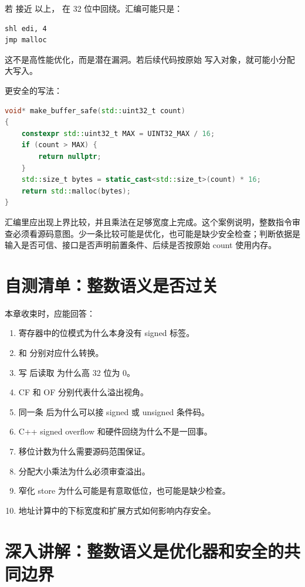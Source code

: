 若  接近  以上， 在 32 位中回绕。汇编可能只是：

\begin{lstlisting}
shl edi, 4
jmp malloc
\end{lstlisting}

这不是高性能优化，而是潜在漏洞。若后续代码按原始  写入对象，就可能小分配大写入。

更安全的写法：

\begin{lstlisting}[language=C++]
void* make_buffer_safe(std::uint32_t count)
{
    constexpr std::uint32_t MAX = UINT32_MAX / 16;
    if (count > MAX) {
        return nullptr;
    }
    std::size_t bytes = static_cast<std::size_t>(count) * 16;
    return std::malloc(bytes);
}
\end{lstlisting}

汇编里应出现上界比较，并且乘法在足够宽度上完成。这个案例说明，整数指令审查必须看源码意图。少一条比较可能是优化，也可能是缺少安全检查；判断依据是输入是否可信、接口是否声明前置条件、后续是否按原始 count 使用内存。

\section{自测清单：整数语义是否过关}

本章收束时，应能回答：

\begin{enumerate}
  \item 寄存器中的位模式为什么本身没有 signed 标签。
  \item {} 和  分别对应什么转换。
  \item 写  后读取  为什么高 32 位为 0。
  \item CF 和 OF 分别代表什么溢出视角。
  \item 同一条  后为什么可以接 signed 或 unsigned 条件码。
  \item C++ signed overflow 和硬件回绕为什么不是一回事。
  \item 移位计数为什么需要源码范围保证。
  \item 分配大小乘法为什么必须审查溢出。
  \item 窄化 store 为什么可能是有意取低位，也可能是缺少检查。
  \item 地址计算中的下标宽度和扩展方式如何影响内存安全。
\end{enumerate}

\section{深入讲解：整数语义是优化器和安全的共同边界}

